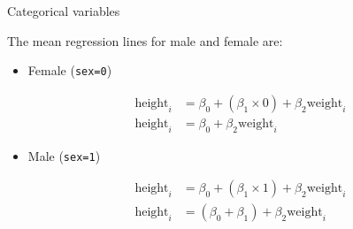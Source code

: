 \documentclass[pdf,handout]{beamer}
\begin{document}
\begin{frame}{Categorical variables}

The mean regression lines for male and female are:

\begin{itemize}\addtolength{\itemsep}{2\baselineskip}

\item Female (\texttt{sex=0})

$$
\begin{aligned}
    \mathrm{height}_i & = \beta_0 + (\beta_1 \times 0) + \beta_2\mathrm{weight}_i\\
    \mathrm{height}_i & = \beta_0 + \beta_2\mathrm{weight}_i
\end{aligned}
$$

\item Male (\texttt{sex=1})

$$
\begin{aligned}
    \mathrm{height}_i & = \beta_0 + (\beta_1 \times 1) + \beta_2\mathrm{weight}_i\\
    \mathrm{height}_i & = (\beta_0 + \beta_1) + \beta_2\mathrm{weight}_i
\end{aligned}
$$

\end{itemize}

\end{frame}

\end{document}
